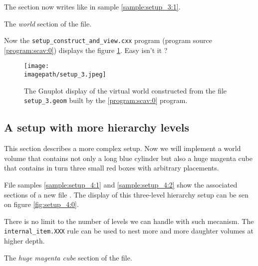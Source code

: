 The  section now writes like in sample \ref{sample:setup_3:1}.
\begin{sample}[h]
\caption{The \emph{world} section of the  file.}
\label{sample:setup_3:1}
\end{sample}

Now the \texttt{setup\_construct\_and\_view.cxx} program (program source
\ref{program:scav:0}) displays the figure \ref{fig:setup_3:0}.
Easy isn't it ?

\begin{figure}[h]
\begin{center}
\texttt{[image: \\imagepath/setup\_3.jpeg]}
\end{center}
\caption{The Gnuplot  display of the  virtual world constructed
  from   the   file   \texttt{setup\_3.geom}  built   by   the
  \ref{program:scav:0} program.}\label{fig:setup_3:0}
\end{figure}

\clearpage

\subsection{A setup with more hierarchy levels}

This section describes a more complex setup. Now we will implement a
world volume that contains not only a long blue cylinder but also
a huge magenta cube that contains in turn three small red boxes
with arbitrary placements.

File samples \ref{sample:setup_4:1} and \ref{sample:setup_4:2}
show the associated sections of a new file .
The display of this three-level hierarchy setup can be sen on figure \ref{fig:setup_4:0}.

There is no limit to the number of levels we can handle with such mecanism.
The \texttt{internal\_item.XXX} rule can be used to nest more and more
daughter volumes at higher depth.

\begin{sample}[h]
\caption{The \emph{huge magenta cube}
  section of the   file.}
\label{sample:setup_4:1}
\end{sample}

